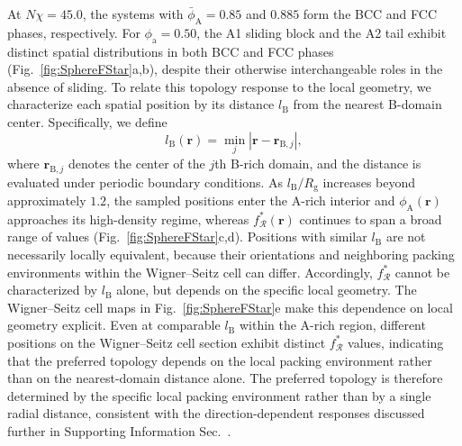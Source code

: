 At $N\chi=45.0$, the systems with $\bar{\phi}_{\mathrm A}=0.85$ and $0.885$ form the BCC and FCC phases, respectively.
For $\phi_{\mathrm a}=0.50$, the A1 sliding block and the A2 tail exhibit distinct spatial distributions in both BCC and FCC phases (Fig.~\ref{fig:SphereFStar}a,b), despite their otherwise interchangeable roles in the absence of sliding.
To relate this topology response to the local geometry, we characterize each spatial position by its distance $l_{\mathrm B}$ from the nearest B-domain center.
Specifically, we define
\begin{equation}
    l_{\mathrm B}(\bm r)
    =
    \min_j
    \left|
        \bm r-\bm r_{\mathrm B,j}
    \right|,
\end{equation}
where $\bm r_{\mathrm B,j}$ denotes the center of the $j$th B-rich domain, and the distance is evaluated under periodic boundary conditions.
As $l_{\mathrm B}/R_{\mathrm g}$ increases beyond approximately $1.2$, the sampled positions enter the A-rich interior and $\phi_{\mathrm A}(\bm r)$ approaches its high-density regime, whereas $f_{\mathcal R}^{\ast}(\bm r)$ continues to span a broad range of values (Fig.~\ref{fig:SphereFStar}c,d).
Positions with similar $l_{\mathrm B}$ are not necessarily locally equivalent, because their orientations and neighboring packing environments within the Wigner--Seitz cell can differ.
Accordingly, $f_{\mathcal R}^{\ast}$ cannot be characterized by $l_{\mathrm B}$ alone, but depends on the specific local geometry.
The Wigner--Seitz cell maps in Fig.~\ref{fig:SphereFStar}e make this dependence on local geometry explicit.
Even at comparable $l_{\mathrm B}$ within the A-rich region, different positions on the Wigner--Seitz cell section exhibit distinct $f_{\mathcal R}^{\ast}$ values, indicating that the preferred topology depends on the local packing environment rather than on the nearest-domain distance alone.
The preferred topology is therefore determined by the specific local packing environment rather than by a single radial distance, consistent with the direction-dependent responses discussed further in Supporting Information Sec.~.


